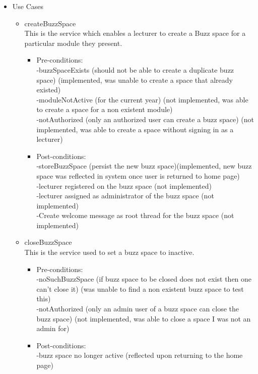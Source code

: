 \begin {itemize}
\item Use Cases
\begin {itemize}
\item {createBuzzSpace}\\
This is the service which enables a lecturer to create a Buzz space for a particular module they present.
\begin {itemize}
\item Pre-conditions:\\
-buzzSpaceExists (should not be able to create a duplicate buzz space) (implemented, was unable to create a space that already existed)\\
-moduleNotActive (for the current year) (not implemented, was able to create a space for a non existent module)\\
-notAuthorized (only an authorized user can create a buzz space) (not implemented, was able to create a space without signing in as a lecturer)\\

\item Post-conditions:\\
-storeBuzzSpace (persist the new buzz space)(implemented, new buzz space was reflected in system once user is returned to home page)\\
-lecturer registered on the buzz space (not implemented)\\
-lecturer assigned as administrator of the buzz space (not implemented)\\
-Create welcome message as root thread for the buzz space (not implemented)\\
\end {itemize}

\item {closeBuzzSpace}\\
This is the service used to set a buzz space to inactive.
\begin {itemize}
\item Pre-conditions: \\
-noSuchBuzzSpace (if buzz space to be closed does not exist then one can't close it) (was unable to find a non existent buzz space to test this)\\
        -notAuthorized (only an admin user of a buzz space can close the buzz space) (not implemented, was able to close a space I was not an admin for)\\
\item Post-conditions:\\
-buzz space no longer active (reflected upon returning to the home page)\\
\end{itemize}


\end{itemize}
\end{itemize}
